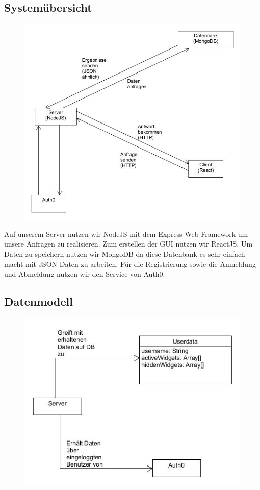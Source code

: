	\subsection{Systemübersicht}
		\begin{figure}[H]
			\includegraphics[scale=0.6]{images/SYCArchitektur}
		\end{figure}
	
	Auf unserem Server nutzen wir NodeJS mit dem Express Web-Framework um unsere Anfragen zu realisieren. Zum erstellen der GUI
	nutzen wir ReactJS. Um Daten zu speichern nutzen wir MongoDB da diese Datenbank es sehr einfach macht mit JSON-Daten zu arbeiten.
	Für die Registrierung sowie die Anmeldung und Abmeldung nutzen wir den Service von Auth0.
	
	\label{data}
	\subsection{Datenmodell}
	
		\begin{figure}[H]
			\includegraphics[scale=0.6]{images/Datenmodell}
		\end{figure}
	
